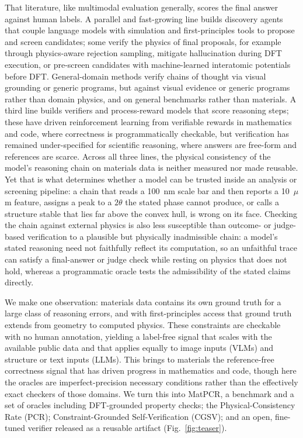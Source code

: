 \documentclass[pdflatex,sn-nature]{sn-jnl}
\begin{document}
That literature, like multimodal evaluation generally, scores the final answer
against human labels. A parallel and fast-growing line builds discovery agents that
couple language models with simulation and first-principles tools to propose and
screen candidates;\cite{dreams2025,crystalyse2025,mapps2025,atomagents2024,llmatdesign2024,matpc2025,kang2024chatmof,zhang2024honeycomb,survey2025aimat}
some verify the physics of final proposals, for example through physics-aware
rejection sampling,\cite{physrej2025} mitigate hallucination during DFT
execution,\cite{dreams2025} or pre-screen candidates with machine-learned
interatomic potentials before DFT.\cite{genbaselines2025,chgnet2023} General-domain
methods verify chains of thought via visual grounding or generic
programs,\cite{corgi2025,mmverify2025,vlmr3_2026,prove2024} but against visual
evidence or generic programs rather than domain physics, and on general benchmarks
rather than materials. A third line builds verifiers and process-reward models that
score reasoning steps;\cite{processbench2025,compassverifier2025,t1verify2025} these
have driven reinforcement learning from verifiable rewards in mathematics and code,
where correctness is programmatically checkable,\cite{deepseekr1_2025} but
verification has remained under-specified for scientific reasoning, where answers are
free-form and references are scarce.\cite{scirlvr2026} Across all three lines, the
physical consistency of the model's reasoning chain on materials data is neither
measured nor made reusable. Yet that is what
determines whether a model can be trusted inside an analysis or screening pipeline:
a chain that reads a 100~nm scale bar and then reports a 10~$\mu$m feature, assigns
a peak to a $2\theta$ the stated phase cannot produce, or calls a structure stable
that lies far above the convex hull, is wrong on its face. Checking the chain against
external physics is also less susceptible than outcome- or judge-based verification to a
plausible but physically inadmissible chain: a model's stated reasoning need not
faithfully reflect its computation, so an unfaithful trace can satisfy a final-answer or
judge check while resting on physics that does not hold, whereas a programmatic oracle
tests the admissibility of the stated claims directly.\cite{faithflow2026}

We make one observation: materials data contains its own
ground truth for a large class of reasoning errors, and with first-principles access
that ground truth extends from geometry to computed physics. These constraints are
checkable with no human annotation, yielding a label-free signal that scales with the
available public data and that applies equally to image inputs (VLMs) and
structure or text inputs (LLMs). This brings to materials the reference-free correctness
signal that has driven progress in mathematics and code, though here the oracles are
imperfect-precision necessary conditions rather than the effectively exact checkers of
those domains. We turn this into MatPCR, a benchmark and a set of
oracles including DFT-grounded property checks; the Physical-Consistency Rate (PCR);
Constraint-Grounded Self-Verification (CGSV); and an open, fine-tuned verifier
released as a reusable artifact (Fig.~\ref{fig:teaser}).
\end{document}
